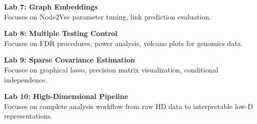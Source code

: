 \vspace{0.2cm}

\noindent\textbf{Lab 7: Graph Embeddings} \\
Focuses on Node2Vec parameter tuning, link prediction evaluation.

\vspace{0.2cm}

\noindent\textbf{Lab 8: Multiple Testing Control} \\
Focuses on FDR procedures, power analysis, volcano plots for genomics data.

\vspace{0.2cm}

\noindent\textbf{Lab 9: Sparse Covariance Estimation} \\
Focuses on graphical lasso, precision matrix visualization, conditional independence.

\vspace{0.2cm}

\noindent\textbf{Lab 10: High-Dimensional Pipeline} \\
Focuses on complete analysis workflow from raw HD data to interpretable low-D representations.

\vspace{0.2cm}

\newpage
{}
